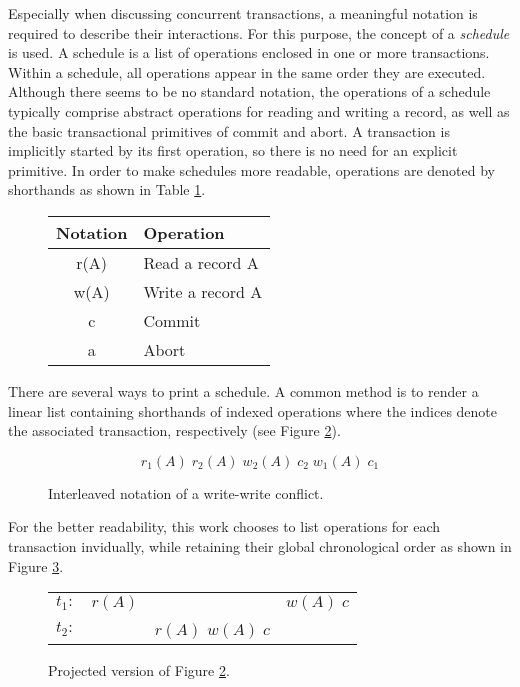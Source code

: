 Especially when discussing concurrent transactions, a meaningful notation is
required to describe their interactions. For this purpose, the concept of a
\emph{schedule} is used. A schedule is a list of operations enclosed in one or
more transactions. Within a schedule, all operations appear in the same order
they are executed. Although there seems to be no standard notation, the
operations of a schedule typically comprise abstract operations for reading and
writing a record, as well as the basic transactional primitives of commit and
abort. A transaction is implicitly started by its first operation, so there is
no need for an explicit primitive. In order to make schedules more readable,
operations are denoted by shorthands as shown in Table
\ref{tab:schedule_notation}.

\begin{figure}[h!]
    \centering
    \begin{tabular}{|c|l|}
        \hline
        \textbf{Notation} & \textbf{Operation}\\
        \hline
        r(A) & Read a record A  \\ \hline
        w(A) & Write a record A \\ \hline
        c    & Commit           \\ \hline
        a    & Abort            \\
        \hline
    \end{tabular}
    \caption{}
    \label{tab:schedule_notation}
\end{figure}

There are several ways to print a schedule. A common method is to render a
linear list containing shorthands of indexed operations where the indices denote
the associated transaction, respectively (see Figure
\ref{fig:schedule_interleaved}).

\begin{figure}[h!]
    \centering
    \[
        r_1(A)\; r_2(A)\; w_2(A)\; c_2\; w_1(A)\; c_1
    \]
    \caption{Interleaved notation of a write-write conflict.}
    \label{fig:schedule_interleaved}
\end{figure}

For the better readability, this work chooses to list operations for each transaction invidually, while retaining their global chronological order as shown in Figure \ref{fig:schedule_projected}.

\begin{figure}[h!]
    \centering
    \begin{tabular}{r c c c}
        $t_1:$ & $r(A)$ &                     & $w(A)\; c$ \\
        $t_2:$ &        & $r(A)$\; $w(A)\; c$ &            \\
    \end{tabular}
    \caption{Projected version of Figure \ref{fig:schedule_interleaved}.}
    \label{fig:schedule_projected}
\end{figure}

